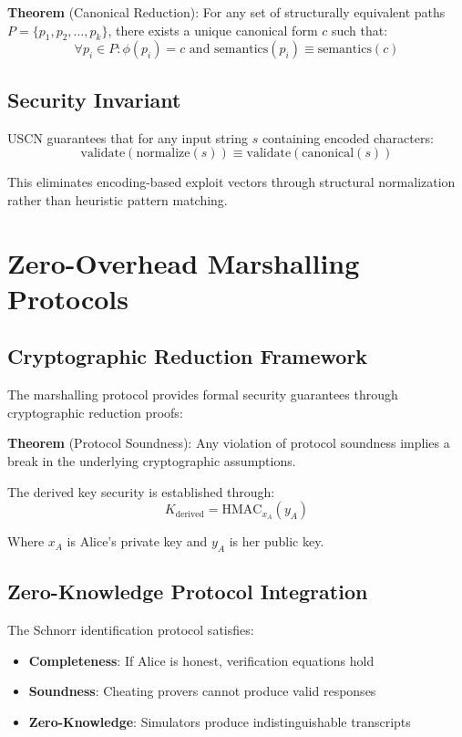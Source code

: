 \documentclass{article}
\begin{document}
\textbf{Theorem} (Canonical Reduction): For any set of structurally equivalent paths $P = \{p_1, p_2, \ldots, p_k\}$, there exists a unique canonical form $c$ such that:
\[ \forall p_i \in P : \phi(p_i) = c \text{ and } \text{semantics}(p_i) \equiv \text{semantics}(c) \]

\subsection{Security Invariant}

USCN guarantees that for any input string $s$ containing encoded characters:
\[ \text{validate}(\text{normalize}(s)) \equiv \text{validate}(\text{canonical}(s)) \]

This eliminates encoding-based exploit vectors through structural normalization rather than heuristic pattern matching.

\section{Zero-Overhead Marshalling Protocols}

\subsection{Cryptographic Reduction Framework}

The marshalling protocol provides formal security guarantees through cryptographic reduction proofs:

\textbf{Theorem} (Protocol Soundness): Any violation of protocol soundness implies a break in the underlying cryptographic assumptions.

The derived key security is established through:
\[ K_{\text{derived}} = \text{HMAC}_{x_A}(y_A) \]

Where $x_A$ is Alice's private key and $y_A$ is her public key.

\subsection{Zero-Knowledge Protocol Integration}

The Schnorr identification protocol satisfies:
\begin{itemize}
    \item \textbf{Completeness}: If Alice is honest, verification equations hold
    \item \textbf{Soundness}: Cheating provers cannot produce valid responses
    \item \textbf{Zero-Knowledge}: Simulators produce indistinguishable transcripts
\end{itemize}
\end{document}
